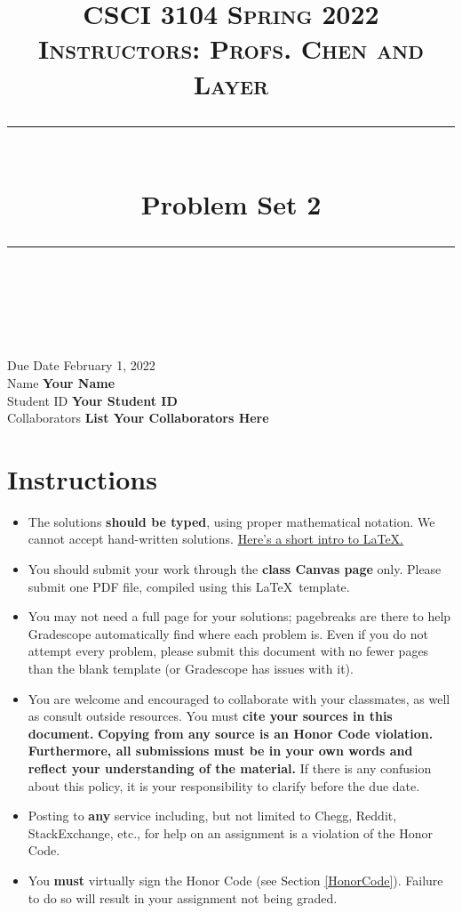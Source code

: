 \documentclass[11pt]{article}
\title{
\normalfont \normalsize 
\textsc{CSCI 3104 Spring 2022 \\ 
Instructors: Profs. Chen and Layer} \\
[10pt] 
\rule{\linewidth}{0.5pt} \\[6pt] 
\huge Problem Set 2 \\
\rule{\linewidth}{2pt}  \\[10pt]
}
\date{}
\theoremstyle{definition}
\theoremstyle{definition}
\theoremstyle{definition}
\begin{document}

\maketitle


\noindent
Due Date \dotfill February 1, 2022 \\
Name \dotfill \textbf{Your Name} \\
Student ID \dotfill \textbf{Your Student ID} \\
Collaborators \dotfill \textbf{List Your Collaborators Here}

\tableofcontents

\section{Instructions}
 \begin{itemize}
	\item The solutions \textbf{should be typed}, using proper mathematical notation. We cannot accept hand-written solutions. \href{http://ece.uprm.edu/~caceros/latex/introduction.pdf}{Here's a short intro to \LaTeX.}
	\item You should submit your work through the \textbf{class Canvas page} only. Please submit one PDF file, compiled using this \LaTeX \ template.
	\item You may not need a full page for your solutions; pagebreaks are there to help Gradescope automatically find where each problem is. Even if you do not attempt every problem, please submit this document with no fewer pages than the blank template (or Gradescope has issues with it).

	\item You are welcome and encouraged to collaborate with your classmates, as well as consult outside resources. You must \textbf{cite your sources in this document.} \textbf{Copying from any source is an Honor Code violation. Furthermore, all submissions must be in your own words and reflect your understanding of the material.} If there is any confusion about this policy, it is your responsibility to clarify before the due date. 

	\item Posting to \textbf{any} service including, but not limited to Chegg, Reddit, StackExchange, etc., for help on an assignment is a violation of the Honor Code.

	\item You \textbf{must} virtually sign the Honor Code (see Section \ref{HonorCode}). Failure to do so will result in your assignment not being graded.
\end{itemize}
\end{document}
